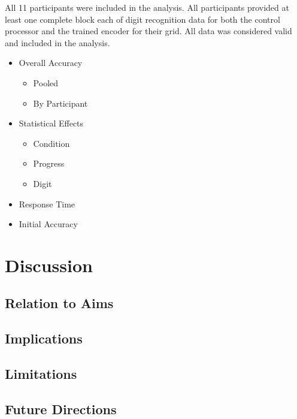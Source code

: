 \documentclass[11pt]{book}
\begin{document}
All 11 participants were included in the analysis.
All participants provided at least one complete block each of digit recognition data for both the control processor and the trained encoder for their grid.
All data was considered valid and included in the analysis.

\begin{itemize}
\item Overall Accuracy
\label{sec:org98890eb}

\begin{itemize}
\item Pooled
\label{sec:org588aeae}

\item By Participant
\label{sec:org0144534}
\end{itemize}

\item Statistical Effects
\label{sec:orga1c123e}

\begin{itemize}
\item Condition
\label{sec:org5e53f6c}

\item Progress
\label{sec:org5d09f8e}

\item Digit
\label{sec:org90ac40d}
\end{itemize}

\item Response Time
\label{sec:orgae492dd}

\item Initial Accuracy
\label{sec:orge7386e2}
\end{itemize}

\part{Discussion}
\label{sec:org7a22174}
\chapter{Relation to Aims}
\label{sec:org98cb18e}
\chapter{Implications}
\label{sec:orgc1fd62b}
\chapter{Limitations}
\label{sec:org059508e}
\chapter{Future Directions}
\label{sec:org521acb7}
\end{document}
